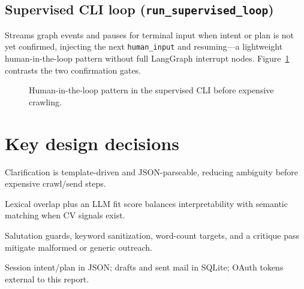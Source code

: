 \documentclass[11pt,a4paper]{article}
\begin{document}
\subsection{Supervised CLI loop (\texttt{run\_supervised\_loop})}
Streams graph events and pauses for terminal input when intent or plan is not yet confirmed, injecting the next \texttt{human\_input} and resuming---a lightweight human-in-the-loop pattern without full LangGraph interrupt nodes. Figure~\ref{fig:hil-loop} contrasts the two confirmation gates.

\begin{figure}[htbp]
\centering
{}
\caption{Human-in-the-loop pattern in the supervised CLI before expensive crawling.}
\label{fig:hil-loop}
\end{figure}


\section{Key design decisions}

\begin{description}[style=nextline,font=\normalfont\bfseries]
  \item[Slot-filling vs.\ free chat] Clarification is template-driven and JSON-parseable, reducing ambiguity before expensive crawl/send steps.
  \item[Hybrid relevance] Lexical overlap plus an LLM fit score balances interpretability with semantic matching when CV signals exist.
  \item[Email quality gates] Salutation guards, keyword sanitization, word-count targets, and a critique pass mitigate malformed or generic outreach.
  \item[Persistence boundaries] Session intent/plan in JSON; drafts and sent mail in SQLite; OAuth tokens external to this report.
\end{description}
\end{document}
